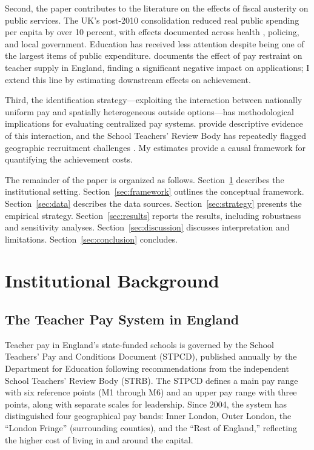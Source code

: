 \documentclass[12pt]{article}
\begin{document}
Second, the paper contributes to the literature on the effects of fiscal austerity on public services. The UK's post-2010 consolidation reduced real public spending per capita by over 10 percent, with effects documented across health \citep{nickell2005poverty}, policing, and local government. Education has received less attention despite being one of the largest items of public expenditure. \citet{sims2020teacher} documents the effect of pay restraint on teacher supply in England, finding a significant negative impact on applications; I extend this line by estimating downstream effects on achievement.

Third, the identification strategy---exploiting the interaction between nationally uniform pay and spatially heterogeneous outside options---has methodological implications for evaluating centralized pay systems. \citet{allen2018understanding} provide descriptive evidence of this interaction, and the School Teachers' Review Body has repeatedly flagged geographic recruitment challenges \citep{strb2023report}. My estimates provide a causal framework for quantifying the achievement costs.

The remainder of the paper is organized as follows. Section~\ref{sec:background} describes the institutional setting. Section~\ref{sec:framework} outlines the conceptual framework. Section~\ref{sec:data} describes the data sources. Section~\ref{sec:strategy} presents the empirical strategy. Section~\ref{sec:results} reports the results, including robustness and sensitivity analyses. Section~\ref{sec:discussion} discusses interpretation and limitations. Section~\ref{sec:conclusion} concludes.


\section{Institutional Background}\label{sec:background}

\subsection{The Teacher Pay System in England}

Teacher pay in England's state-funded schools is governed by the School Teachers' Pay and Conditions Document (STPCD), published annually by the Department for Education following recommendations from the independent School Teachers' Review Body (STRB). The STPCD defines a main pay range with six reference points (M1 through M6) and an upper pay range with three points, along with separate scales for leadership. Since 2004, the system has distinguished four geographical pay bands: Inner London, Outer London, the ``London Fringe'' (surrounding counties), and the ``Rest of England,'' reflecting the higher cost of living in and around the capital.
\end{document}

